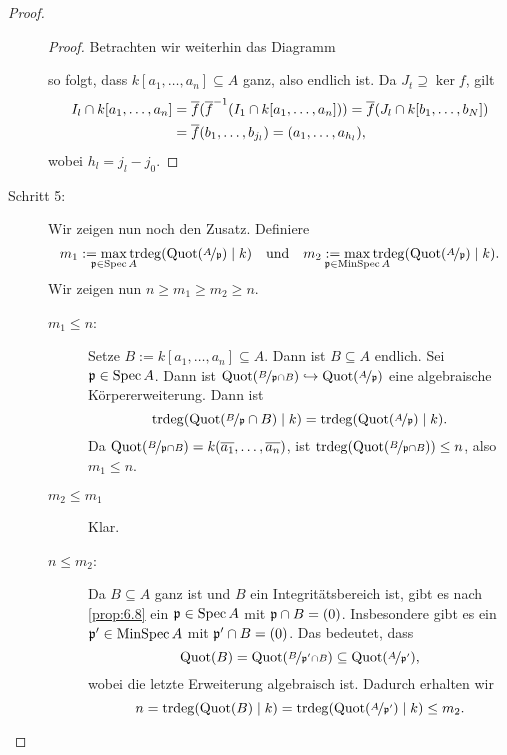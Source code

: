 \documentclass[12pt,a4paper]{scrartcl}
\theoremstyle{cplain}
\theoremstyle{cdef}
\begin{document}
\begin{proof}
\begin{description}
\begin{proof}
			Betrachten wir weiterhin das Diagramm
			\begin{center}
			\end{center}
			so folgt, dass $k[a_1,\ldots,a_n] \subseteq A$ ganz, also endlich ist. Da $J_t \supseteq \ker f$, gilt \begin{align*}
				I_l\cap k[a_1,\dots, a_n] &= \overline{f}(\overline{f}^{-1}(I_1\cap k[a_1,\dots, a_n])) = \overline{f}(J_l\cap k[b_1,\dots, b_N]) \\ &= \overline{f}(b_1,\dots, b_{j_l}) = (a_1,\dots, a_{h_l}),
			\end{align*}
			wobei $h_l = j_l-j_0$.
		\end{proof}
		
		\item[Schritt 5:] Wir zeigen nun noch den Zusatz. Definiere \[m_1 := \max_{\mathclap{\fp\in \Spec A}}\trdeg(\Quot(\fak A\fp)\mid k) \quad\text{und}\quad m_2 := \max_{\mathclap{\fp\in\MinSpec A}} \trdeg(\Quot(\fak A\fp)\mid k).\]
		Wir zeigen nun $n\ge m_1\ge m_2\ge n$.
		\begin{description}
			\item[$m_1 \le n$:] Setze $B := k[a_1,\dots, a_n] \subseteq A$. Dann ist $B\subseteq A$ endlich. Sei $\mathfrak{p}\in\operatorname{Spec} A$. Dann ist $\operatorname{Quot}(\nicefrac{B}{\mathfrak{p}\cap B})\hookrightarrow \operatorname{Quot}(\nicefrac{A}{\mathfrak{p}})$ eine algebraische Körpererweiterung. Dann ist
			\[\operatorname{trdeg}(\operatorname{Quot}(\nicefrac{B}{\mathfrak{p}}\cap B)\mid k) = \operatorname{trdeg}(\operatorname{Quot}(\nicefrac{A}{\mathfrak{p}})\mid k).\]
			Da $\operatorname{Quot}(\nicefrac{B}{\mathfrak{p}\cap B}) = k(\overline{a_1},\dots, \overline{a_n})$, ist $\operatorname{trdeg}(\operatorname{Quot}(\nicefrac{B}{\mathfrak{p}\cap B}))\le n$, also $m_1\le n$.
			\item[$m_2 \le m_1$] Klar.
			\item[$n \le m_2$:] Da $B\subseteq A$ ganz ist und $B$ ein Integritätsbereich ist, gibt es nach \cref{prop:6.8} ein $\mathfrak{p}\in \operatorname{Spec} A$ mit $\mathfrak{p}\cap B = (0)$. Insbesondere gibt es ein $\mathfrak{p}' \in \operatorname{MinSpec} A$ mit $\mathfrak{p}'\cap B = (0)$. Das bedeutet, dass
			\[\operatorname{Quot}(B) = \operatorname{Quot}(\nicefrac{B}{\mathfrak{p}'\cap B})\subseteq \operatorname{Quot}(\nicefrac{A}{\mathfrak{p}'}),\]
			wobei die letzte Erweiterung algebraisch ist. Dadurch erhalten wir
			\[ n = \operatorname{trdeg}(\operatorname{Quot}(B)\mid k) = \operatorname{trdeg}(\operatorname{Quot}(\nicefrac{A}{\mathfrak{p}'})\mid k) \le m_2.\qedhere\]
		\end{description}
	\end{description}
\end{proof}
\end{document}
